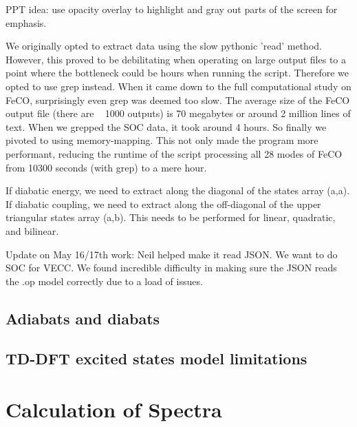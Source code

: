 \documentclass[letterpaper, 12pt, oneside]{report}
\begin{document}
    PPT idea: use opacity overlay to highlight and gray out parts of the screen for emphasis.

    We originally opted to extract data using the slow pythonic 'read' method. However, this proved to be debilitating when operating on large output files to a point where the bottleneck could be hours when running the script. Therefore we opted to use grep instead. When it came down to the full computational study on FeCO, surprisingly even grep was deemed too slow. The average size of the FeCO output file (there are ~ 1000 outputs) is 70 megabytes or around 2 million lines of text. When we grepped the SOC data, it took around 4 hours. So finally we pivoted to using memory-mapping. This not only made the program more performant, reducing the runtime of the script processing all 28 modes of FeCO from 10300 seconds (with grep) to a mere hour.

    If diabatic energy, we need to extract along the diagonal of the states array (a,a). 
    If diabatic coupling, we need to extract along the off-diagonal of the upper triangular states array (a,b). 
    This needs to be performed for linear, quadratic, and bilinear.  

    Update on May 16/17th work:
    Neil helped make it read JSON. We want to do SOC for VECC. We found incredible difficulty in making sure the JSON reads the .op model correctly due to a load of issues.


    \subsection{Adiabats and diabats}
    \subsection{TD-DFT excited states model limitations}

\section{Calculation of Spectra}
\end{document}
